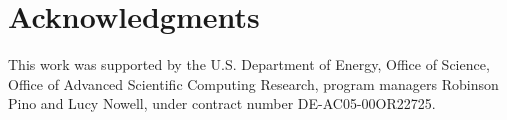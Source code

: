 \section{Acknowledgments}
\label{section:acknowledgments}

This work was supported by the U.S. Department of Energy, Office of Science,
Office of Advanced Scientific Computing Research, program managers Robinson Pino
and Lucy Nowell, under contract number DE-AC05-00OR22725. 